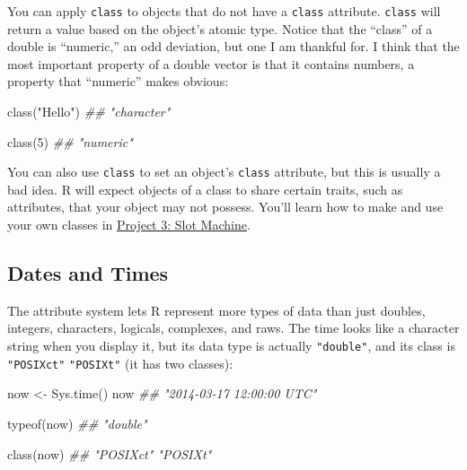 \documentclass[
  letterpaper,
  DIV=11,
  numbers=noendperiod]{scrbook}
\newenvironment{Shaded}{\begin{snugshade}}{\end{snugshade}}
\newcommand{\DecValTok}[1]{\textcolor[rgb]{0.68,0.00,0.00}{#1}}
\newcommand{\DocumentationTok}[1]{\textcolor[rgb]{0.37,0.37,0.37}{\textit{#1}}}
\newcommand{\FunctionTok}[1]{\textcolor[rgb]{0.28,0.35,0.67}{#1}}
\newcommand{\NormalTok}[1]{\textcolor[rgb]{0.00,0.23,0.31}{#1}}
\newcommand{\OtherTok}[1]{\textcolor[rgb]{0.00,0.23,0.31}{#1}}
\newcommand{\StringTok}[1]{\textcolor[rgb]{0.13,0.47,0.30}{#1}}
\begin{document}
\begin{Shaded}
\end{Shaded}

You can apply \texttt{class} to objects that do not have a
\texttt{class} attribute. \texttt{class} will return a value based on
the object's atomic type. Notice that the ``class'' of a double is
``numeric,'' an odd deviation, but one I am thankful for. I think that
the most important property of a double vector is that it contains
numbers, a property that ``numeric'' makes obvious:

\begin{Shaded}
\begin{Highlighting}[]
\FunctionTok{class}\NormalTok{(}\StringTok{"Hello"}\NormalTok{)}
\DocumentationTok{\#\#  "character"}

\FunctionTok{class}\NormalTok{(}\DecValTok{5}\NormalTok{)}
\DocumentationTok{\#\#  "numeric"}
\end{Highlighting}
\end{Shaded}

You can also use \texttt{class} to set an object's \texttt{class}
attribute, but this is usually a bad idea. R will expect objects of a
class to share certain traits, such as attributes, that your object may
not possess. You'll learn how to make and use your own classes in
\hyperref[sec-project-slots]{Project 3: Slot Machine}.

\subsection{Dates and Times}\label{dates-and-times}

The attribute system lets R represent more types of data than just
doubles, integers, characters, logicals, complexes, and raws. The time
looks like a character string when you display it, but its data type is
actually \texttt{"double"}, and its class is \texttt{"POSIXct"}
\texttt{"POSIXt"} (it has two classes):

\begin{Shaded}
\begin{Highlighting}[]
\NormalTok{now }\OtherTok{\textless{}{-}} \FunctionTok{Sys.time}\NormalTok{()}
\NormalTok{now}
\DocumentationTok{\#\# "2014{-}03{-}17 12:00:00 UTC"}

\FunctionTok{typeof}\NormalTok{(now)}
\DocumentationTok{\#\#  "double"}

\FunctionTok{class}\NormalTok{(now)}
\DocumentationTok{\#\# "POSIXct" "POSIXt" }
\end{Highlighting}
\end{Shaded}
\end{document}
